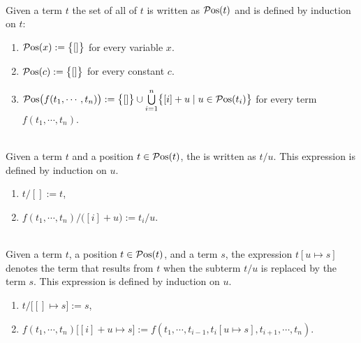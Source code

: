 \begin{Definition} \hspace*{\fill} \\
  Given a term $t$ the set of all  of $t$ is written as $\mathcal{P}\mathrm{os}(t)$ and is defined by
  induction on $t$:
  \begin{enumerate}
  \item $\mathcal{P}\mathrm{os}(x) := \bigl\{ [] \bigr\}$ \quad for every variable $x$.
  \item $\mathcal{P}\mathrm{os}(c) := \bigl\{ [] \bigr\}$ \quad for every constant $c$.
  \item $\mathcal{P}\mathrm{os}\bigl(f(t_1,\cdots,t_n)\bigr) := 
         \bigl\{ [] \bigr\} \cup \bigcup\limits_{i=1}^n \bigl\{ [i] + u \mid u \in \mathcal{P}\mathrm{os}(t_i) \bigr\}$ 
        \quad for every term $f(t_1,\cdots,t_n)$. \eoxs
  \end{enumerate}
\end{Definition}

\begin{Definition} \hspace*{\fill} \\
  Given a term $t$ and a position $t \in \mathcal{P}\mathrm{os}(t)$, the  is
  written as $t/u$.  This expression is defined by induction on $u$.
  \begin{enumerate}
  \item $t/[] := t$,
  \item $f(t_1,\cdots,t_n)/\bigl([i]+u\bigr) := t_i/u$.  \eoxs
  \end{enumerate}
\end{Definition}

\begin{Definition} \hspace*{\fill} \\
  Given a term $t$, a position $t \in \mathcal{P}\mathrm{os}(t)$, and a term $s$, the expression
  $t[u \mapsto s]$ denotes the term that results from $t$ when the subterm $t/u$ is replaced by the term 
  $s$.  This expression is defined by induction on $u$.
  \begin{enumerate}
  \item $t/\bigl[ [] \mapsto s \bigr] := s$,
  \item $f(t_1,\cdots,t_n)\bigl[ [i]+u \mapsto s \bigr] := f(t_1, \cdots, t_{i-1},t_i[u \mapsto s], t_{i+1},\cdots, t_n)$.  
        \eoxs
  \end{enumerate}
\end{Definition}
  
